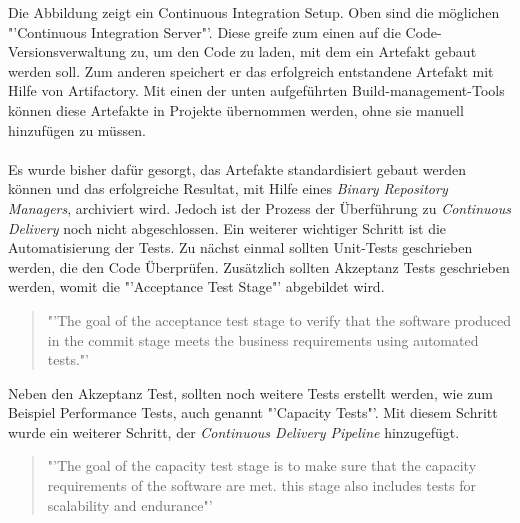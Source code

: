 Die Abbildung zeigt ein Continuous Integration Setup. Oben sind die möglichen "'Continuous Integration Server"'. Diese greife zum einen auf die Code-Versionsverwaltung zu, um den Code zu laden, mit dem ein Artefakt gebaut werden soll. Zum anderen speichert er das erfolgreich entstandene Artefakt mit Hilfe von Artifactory. Mit einen der unten aufgeführten Build-management-Tools können diese Artefakte in Projekte übernommen werden, ohne sie manuell hinzufügen zu müssen.
\\\\
Es wurde bisher dafür gesorgt, das Artefakte standardisiert gebaut werden können und das erfolgreiche Resultat, mit Hilfe eines \textit{Binary Repository Managers}, archiviert wird. Jedoch ist der Prozess der Überführung zu \textit{Continuous Delivery} noch nicht abgeschlossen. Ein weiterer wichtiger Schritt ist die Automatisierung der Tests. Zu nächst einmal sollten Unit-Tests geschrieben werden, die den Code Überprüfen. Zusätzlich sollten Akzeptanz Tests geschrieben werden, womit die "'Acceptance Test Stage"' abgebildet wird.

\begin{quote}
    "'The goal of the acceptance test stage to verify that the software produced in the commit stage meets the business requirements using automated tests."'\cite{CD:AutomatedTesting}
\end{quote}

Neben den Akzeptanz Test, sollten noch weitere Tests erstellt werden, wie zum Beispiel Performance Tests, auch genannt "'Capacity Tests"'. Mit diesem Schritt wurde ein weiterer Schritt, der \textit{Continuous Delivery Pipeline} hinzugefügt.

\begin{quote}
    "'The goal of the capacity test stage is to make sure that the capacity requirements of the software are met. this stage also includes tests for scalability and endurance"'\cite{CD:AutomatedTesting}
\end{quote}

